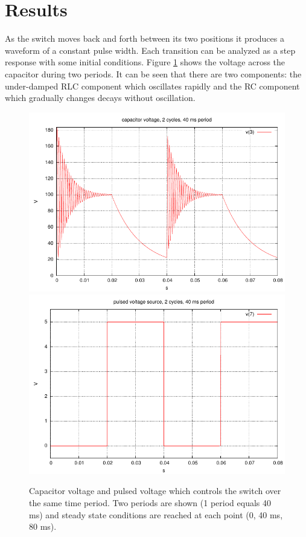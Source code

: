 \documentclass{article}
\begin{document}
\section{Results}

As the switch moves back and forth between its two positions
it produces a waveform of a constant pulse width.
Each transition can be analyzed as a step response with some
initial conditions.
Figure \ref{fig:capv} shows the voltage across the capacitor
during two periods.
It can be seen that there are two components: the under-damped RLC component
which oscillates rapidly and the RC component which gradually changes
decays without oscillation.

\begin{figure}
\center
\includegraphics[scale=1.0]{spice/p_v3-80ms} \\
\includegraphics[scale=1.0]{spice/p_v7-80ms}
\caption{Capacitor voltage and pulsed voltage which controls the switch
over the same time period.
Two periods are shown (1 period equals 40 ms) and steady state conditions
are reached at each point (0, 40 ms, 80 ms).
}
\label{fig:capv}
\end{figure}
\end{document}
